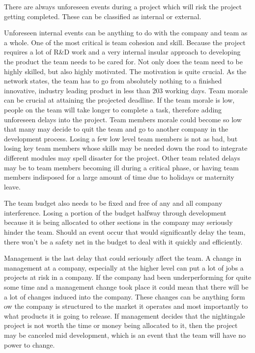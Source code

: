 \documentclass{article}
\begin{document}
There are always unforeseen events during a project which will risk the project getting completed. These can be classified as internal or external.


Unforeseen internal events can be anything to do with the company and team as a whole. One of the most critical is team cohesion and skill. Because the project requires a lot of R\&D work and a very internal insular approach to developing the product the team needs to be cared for. Not only does the team need to be highly skilled, but also highly motivated. The motivation is quite crucial. As the network states, the team has to go from absolutely nothing to a finished innovative, industry leading product in less than 203 working days.
Team morale can be crucial at attaining the projected deadline. If the team morale is low, people on the team will take longer to complete a task, therefore adding unforeseen delays into the project.
Team members morale could become so low that many may decide to quit the team and go to another company in the development process. Losing a few low level team members is not as bad, but losing key team members whose skills may be needed down the road to integrate different modules may spell disaster for the project.
Other team related delays may be to team members becoming ill during a critical phase, or having team members indisposed for a large amount of time due to holidays or maternity leave.


The team budget also needs to be fixed and free of any and all company interference. Losing a portion of the budget halfway through development because it is being allocated to other sections in the company may seriously hinder the team. Should an event occur that would significantly delay the team, there won’t be a safety net in the budget to deal with it quickly and efficiently.


Management is the last delay that could seriously affect the team. A change in management at a company, especially at the higher level can put a lot of jobs a projects at risk in a company. If the company had been underperforming for quite some time and a management change took place it could mean that there will be a lot of changes induced into the company. These changes can be anything form ow the company is structured to the market it operates and most importantly to what products it is going to release.
If management decides that the nightingale project is not worth the time or money being allocated to it, then the project may be canceled mid development, which is an event that the team will have no power to change.
\end{document}
